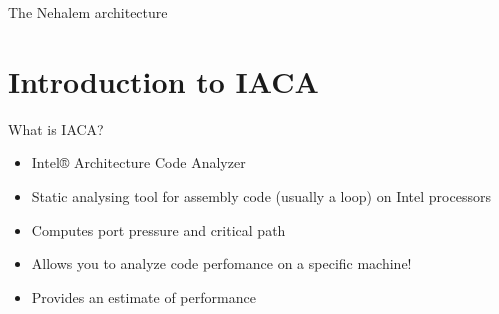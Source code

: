 \documentclass[10pt, tikz,border=2mm, xcolor=dvipsnames]{beamer}
\begin{document}
\begin{frame}{The Nehalem architecture}
        
\end{frame}

\section{Introduction to IACA}

\begin{frame}{What is IACA?}

\begin{itemize}[<+- | alert@+>]
    \item Intel® Architecture Code Analyzer
    \item Static analysing tool for assembly code (usually a loop) on Intel processors
    \item Computes port pressure and critical path
    \item Allows you to analyze code perfomance on a specific machine!
    \item Provides an estimate of performance
\end{itemize}

\end{frame}
\end{document}
